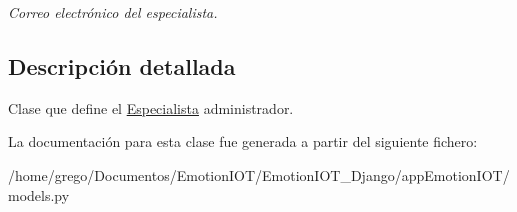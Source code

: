 \begin{DoxyCompactItemize}
\begin{DoxyCompactList}\small\item\em Correo electrónico del especialista. \end{DoxyCompactList}\end{DoxyCompactItemize}


\subsection{Descripción detallada}
Clase que define el \hyperlink{classappEmotionIOT_1_1models_1_1Especialista}{Especialista} administrador. 

La documentación para esta clase fue generada a partir del siguiente fichero\+:\begin{DoxyCompactItemize}
\item 
/home/grego/\+Documentos/\+Emotion\+I\+O\+T/\+Emotion\+I\+O\+T\+\_\+\+Django/app\+Emotion\+I\+O\+T/models.\+py\end{DoxyCompactItemize}

